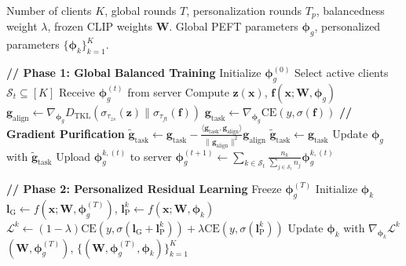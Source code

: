 \begin{algorithm}[ht]
\caption{FedPuReL}
\label{alg:fedpurel}
\begin{algorithmic}[1]
\Require Number of clients $K$, global rounds $T$, personalization rounds $T_p$, balancedness weight $\lambda$, frozen CLIP weights $\boldsymbol{W}$.
\Ensure Global PEFT parameters $\boldsymbol{\phi}_g$, personalized parameters $\{\boldsymbol{\phi}_k\}_{k=1}^K$.

\State \textcolor{adaptive_blue}{\textbf{// Phase 1: Global Balanced Training}}
\State Initialize $\boldsymbol{\phi}_g^{(0)}$
  \State Select active clients $\mathcal{S}_t \subseteq [K]$
    \State Receive $\boldsymbol{\phi}_g^{(t)}$ from server
      \State Compute $\mathbf{z}(\mathbf{x})$, $\mathbf{f}(\mathbf{x}; \boldsymbol{W}, \boldsymbol{\phi}_g)$
      \State $\mathbf{g}_{\text{align}} \gets \nabla_{\boldsymbol{\phi}_g} D_{\text{TKL}}(\sigma_{\tau_{zs}}(\mathbf{z}) \| \sigma_{\tau_{ft}}(\mathbf{f}))$
      \State $\mathbf{g}_{\text{task}} \gets \nabla_{\boldsymbol{\phi}_g} \text{CE}(y, \sigma(\mathbf{f}))$
      \State \textbf{// Gradient Purification}
        \State $\tilde{\mathbf{g}}_{\text{task}} \gets \mathbf{g}_{\text{task}} - \frac{\langle \mathbf{g}_{\text{task}}, \mathbf{g}_{\text{align}} \rangle}{\|\mathbf{g}_{\text{align}}\|^2} \mathbf{g}_{\text{align}}$
      \Else
        \State $\tilde{\mathbf{g}}_{\text{task}} \gets \mathbf{g}_{\text{task}}$
      \EndIf
      \State Update $\boldsymbol{\phi}_g$ with $\tilde{\mathbf{g}}_{\text{task}}$
    \State Upload $\boldsymbol{\phi}_g^{k,(t)}$ to server
  \EndFor
  \State $\boldsymbol{\phi}_g^{(t+1)} \gets \sum_{k \in \mathcal{S}_t} \frac{n_k}{\sum_{j \in \mathcal{S}_t} n_j} \boldsymbol{\phi}_g^{k,(t)}$
\EndFor

\State \textcolor{adaptive_blue}{\textbf{// Phase 2: Personalized Residual Learning}}
\State Freeze $\boldsymbol{\phi}_g^{(T)}$
  \State Initialize $\boldsymbol{\phi}_k$
      \State $\mathbf{l}_{\text{G}} \gets f(\mathbf{x}; \boldsymbol{W}, \boldsymbol{\phi}_g^{(T)})$, $\mathbf{l}_{\text{P}}^k \gets f(\mathbf{x}; \boldsymbol{W}, \boldsymbol{\phi}_k)$
      \State $\mathcal{L}^k \gets (1-\lambda) \text{CE}(y, \sigma(\mathbf{l}_{\text{G}} + \mathbf{l}_{\text{P}}^k)) + \lambda \text{CE}(y, \sigma(\mathbf{l}_{\text{P}}^k))$
      \State Update $\boldsymbol{\phi}_k$ with $\nabla_{\boldsymbol{\phi}_k} \mathcal{L}^k$
    \EndFor
\EndFor
\State \Return $(\boldsymbol{W}, \boldsymbol{\phi}_g^{(T)})$, $\{(\boldsymbol{W}, \boldsymbol{\phi}_g^{(T)}, \boldsymbol{\phi}_k)\}_{k=1}^K$
\end{algorithmic}
\end{algorithm}








